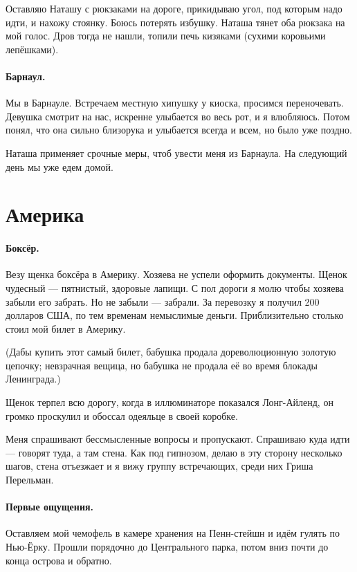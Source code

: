\documentclass{book}
\begin{document}
Оставляю Наташу с рюкзаками на дороге, прикидываю угол, под которым надо идти, и нахожу стоянку.
Боюсь потерять избушку.
Наташа тянет оба рюкзака на мой голос.
Дров тогда не нашли, топили печь кизяками (сухими коровьими лепёшками).

\paragraph{Барнаул.}
Мы в Барнауле.
Встречаем местную хипушку у киоска, просимся переночевать.
Девушка смотрит на нас, искренне улыбается во весь рот, и я влюбляюсь.
Потом понял, что она сильно близорука и улыбается всегда и всем, но было уже поздно.

Наташа применяет срочные меры, чтоб увести меня из Барнаула.
На следующий день мы уже едем домой.

\section*{Америка}

\paragraph{Боксёр.}
Везу щенка боксёра в Америку.
Хозяева не успели оформить документы.
Щенок чудесный --- пятнистый, здоровые лапищи.
С пол дороги я молю чтобы хозяева забыли его забрать.
Но не забыли --- забрали.
За перевозку я получил 200 долларов США, по тем временам немыслимые деньги.
Приблизительно столько стоил мой билет в Америку.

(Дабы купить этот самый билет, бабушка продала дореволюционную золотую цепочку;
невзрачная вещица, но бабушка не продала её во время блокады Ленинграда.)

Щенок терпел всю дорогу, когда в иллюминаторе показался Лонг-Айленд, он громко проскулил и обоссал одеяльце в своей коробке.

Меня спрашивают бессмысленные вопросы и пропускают.
Спрашиваю куда идти --- говорят туда, а там стена.
Как под гипнозом, делаю в эту сторону несколько шагов, стена отъезжает и я вижу группу встречающих, среди них Гриша Перельман.

\paragraph{Первые ощущения.}
Оставляем мой чемофель в камере хранения на Пенн-стейшн и идём гулять по Нью-Ёрку.
Прошли порядочно до Центрального парка, потом вниз почти до конца острова и обратно.
\end{document}
